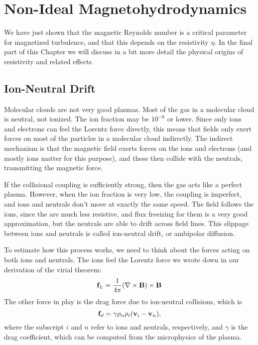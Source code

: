 \section{Non-Ideal Magnetohydrodynamics}

We have just shown that the magnetic Reynolds number is a critical parameter for magnetized turbulence, and that this depends on the resistivity $\eta$. In the final part of this Chapter we will discuss in a bit more detail the physical origins of resistivity and related effects.

\subsection{Ion-Neutral Drift}

Molecular clouds are not very good plasmas. Most of the gas in a molecular cloud is neutral, not ionized. The ion fraction may be $10^{-6}$ or lower. Since only ions and electrons can feel the Lorentz force directly, this means that fields only exert forces on most of the particles in a molecular cloud indirectly. The indirect mechanism is that the magnetic field exerts forces on the ions and electrons (and mostly ions matter for this purpose), and these then collide with the neutrals, transmitting the magnetic force.

If the collisional coupling is sufficiently strong, then the gas acts like a perfect plasma. However, when the ion fraction is very low, the coupling is imperfect, and ions and neutrals don't move at exactly the same speed. The field follows the ions, since the are much less resistive, and flux freeizing for them is a very good approximation, but the neutrals are able to drift across field lines.
This slippage between ions and neutrals is called ion-neutral drift, or ambipolar diffusion.

To estimate how this process works, we need to think about the forces acting on both ions and neutrals. The ions feel the Lorentz force we wrote down in our derivation of the virial theorem:
\begin{equation}
\mathbf{f}_L = \frac{1}{4\pi} (\nabla \times \mathbf{B}) \times \mathbf{B}
\end{equation}
The other force in play is the drag force due to ion-neutral collisions, which is
\begin{equation}
\mathbf{f}_d = \gamma\rho_n \rho_i (\mathbf{v}_i-\mathbf{v}_n),
\end{equation}
where the subscript $i$ and $n$ refer to ions and neutrals, respectively, and $\gamma$ is the drag coefficient, which can be computed from the microphysics of the plasma.


